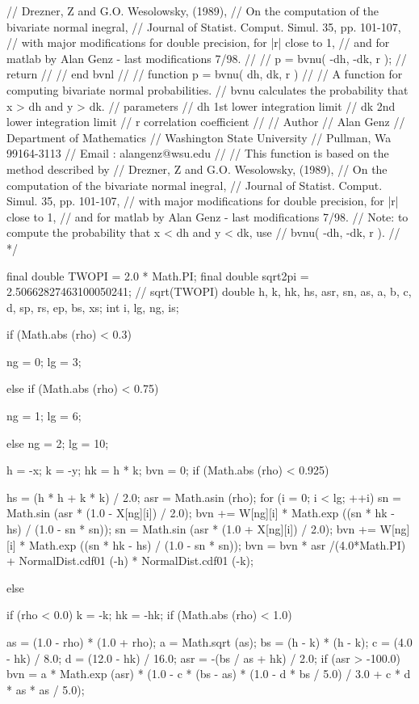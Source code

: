 \begin{code}
\begin{hide}
{//        Drezner, Z and G.O. Wesolowsky, (1989),
//        On the computation of the bivariate normal inegral,
//        Journal of Statist. Comput. Simul. 35, pp. 101-107,
//    with major modifications for double precision, for |r| close to 1,
//    and for matlab by Alan Genz - last modifications 7/98.
//
//      p = bvnu( -dh, -dk, r );
//      return
//
//   end bvnl
//
//      function p = bvnu( dh, dk, r )
//
//  A function for computing bivariate normal probabilities.
//  bvnu calculates the probability that x > dh and y > dk.
//    parameters
//      dh 1st lower integration limit
//      dk 2nd lower integration limit
//      r   correlation coefficient
//
//   Author
//       Alan Genz
//       Department of Mathematics
//       Washington State University
//       Pullman, Wa 99164-3113
//       Email : alangenz@wsu.edu
//
//    This function is based on the method described by
//        Drezner, Z and G.O. Wesolowsky, (1989),
//        On the computation of the bivariate normal inegral,
//        Journal of Statist. Comput. Simul. 35, pp. 101-107,
//    with major modifications for double precision, for |r| close to 1,
//    and for matlab by Alan Genz - last modifications 7/98.
//        Note: to compute the probability that x < dh and y < dk, use
//              bvnu( -dh, -dk, r ).
//
*/

      final double TWOPI = 2.0 * Math.PI;
      final double sqrt2pi = 2.50662827463100050241; // sqrt(TWOPI)
      double h, k, hk, hs, asr, sn, as, a, b, c, d, sp, rs, ep, bs, xs;
      int i, lg, ng, is;

      if (Math.abs (rho) < 0.3) {
         ng = 0;
         lg = 3;

      } else if (Math.abs (rho) < 0.75) {
         ng = 1;
         lg = 6;

      } else {
         ng = 2;
         lg = 10;
      }

      h = -x;
      k = -y;
      hk = h * k;
      bvn = 0;
      if (Math.abs (rho) < 0.925) {
         hs = (h * h + k * k) / 2.0;
         asr = Math.asin (rho);
         for (i = 0; i < lg; ++i) {
            sn = Math.sin (asr * (1.0 - X[ng][i]) / 2.0);
            bvn += W[ng][i] * Math.exp ((sn * hk - hs) / (1.0 - sn * sn));
            sn = Math.sin (asr * (1.0 + X[ng][i]) / 2.0);
            bvn += W[ng][i] * Math.exp ((sn * hk - hs) / (1.0 - sn * sn));
         }
         bvn =  bvn * asr /(4.0*Math.PI) +
                NormalDist.cdf01 (-h) * NormalDist.cdf01 (-k);

      } else {
         if (rho < 0.0) {
            k = -k;
            hk = -hk;
         }
         if (Math.abs (rho) < 1.0) {
            as = (1.0 - rho) * (1.0 + rho);
            a = Math.sqrt (as);
            bs = (h - k) * (h - k);
            c = (4.0 - hk) / 8.0;
            d = (12.0 - hk) / 16.0;
            asr = -(bs / as + hk) / 2.0;
            if (asr > -100.0)
               bvn = a * Math.exp (asr) * (1.0 - c * (bs - as) * (1.0 -
                     d * bs / 5.0) / 3.0 + c * d * as * as / 5.0);

}}}
\end{hide}
\end{code}
